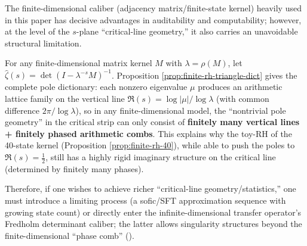 \begin{remark}\label{rem:finite-pole-lattice-barrier}
The finite-dimensional caliber (adjacency matrix/finite-state kernel) heavily used in this paper has decisive advantages in auditability and computability; however, at the level of the \(s\)-plane ``critical-line geometry,'' it also carries an unavoidable structural limitation.

For any finite-dimensional matrix kernel \(M\) with \(\lambda=\rho(M)\), let
\(
\widehat{\zeta}(s)=\det(I-\lambda^{-s}M)^{-1}
\).
Proposition \ref{prop:finite-rh-triangle-dict} gives the complete pole dictionary: each nonzero eigenvalue \(\mu\) produces an arithmetic lattice family on the vertical line
\(
\Re(s)=\log|\mu|/\log\lambda
\)
(with common difference \(2\pi/\log\lambda\)), so in any finite-dimensional model, the ``nontrivial pole geometry'' in the critical strip can only consist of \textbf{finitely many vertical lines + finitely phased arithmetic combs}.
This explains why the toy-RH of the 40-state kernel (Proposition \ref{prop:finite-rh-40}), while able to push the poles to \(\Re(s)=\tfrac12\), still has a highly rigid imaginary structure on the critical line (determined by finitely many phases).

Therefore, if one wishes to achieve richer ``critical-line geometry/statistics,'' one must introduce a limiting process (a sofic/SFT approximation sequence with growing state count) or directly enter the infinite-dimensional transfer operator's Fredholm determinant caliber; the latter allows singularity structures beyond the finite-dimensional ``phase comb'' (\cite{Ruelle1976ZetaExpanding,Ruelle1978Thermodynamic,ParryPollicott1990Zeta}).
\end{remark}

